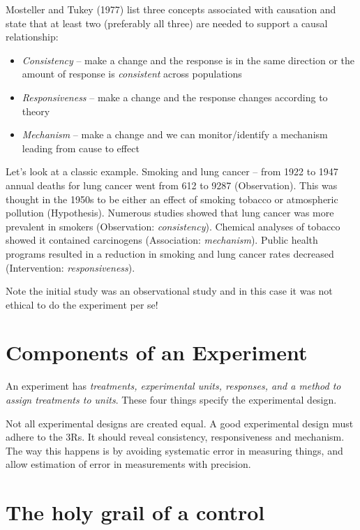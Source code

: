 \documentclass[
]{book}
\providecommand{\tightlist}{%
  \setlength{\itemsep}{0pt}\setlength{\parskip}{0pt}}
\begin{document}
Mosteller and Tukey (1977) list three concepts associated with causation and state that at least two (preferably all three) are needed to support a causal relationship:

\begin{itemize}
\tightlist
\item
  \emph{Consistency} -- make a change and the response is in the same direction or the amount of response is \emph{consistent} across populations
\item
  \emph{Responsiveness} -- make a change and the response changes according to theory
\item
  \emph{Mechanism} -- make a change and we can monitor/identify a mechanism leading from cause to effect
\end{itemize}

Let's look at a classic example. Smoking and lung cancer -- from 1922 to 1947 annual deaths for lung cancer went from 612 to 9287 (Observation). This was thought in the 1950s to be either an effect of smoking tobacco or atmospheric pollution (Hypothesis). Numerous studies showed that lung cancer was more prevalent in smokers (Observation: \emph{consistency}). Chemical analyses of tobacco showed it contained carcinogens (Association: \emph{mechanism}). Public health programs resulted in a reduction in smoking and lung cancer rates decreased (Intervention: \emph{responsiveness}).

Note the initial study was an observational study and in this case it was not ethical to do the experiment per se!

\hypertarget{components-of-an-experiment}{%
\section{Components of an Experiment}\label{components-of-an-experiment}}

An experiment has \emph{treatments, experimental units, responses, and a method to assign treatments to units}. These four things specify the experimental design.

Not all experimental designs are created equal. A good experimental design must adhere to the 3Rs. It should reveal consistency, responsiveness and mechanism. The way this happens is by avoiding systematic error in measuring things, and allow estimation of error in measurements with precision.

\hypertarget{the-holy-grail-of-a-control}{%
\section{The holy grail of a control}\label{the-holy-grail-of-a-control}}
\end{document}
